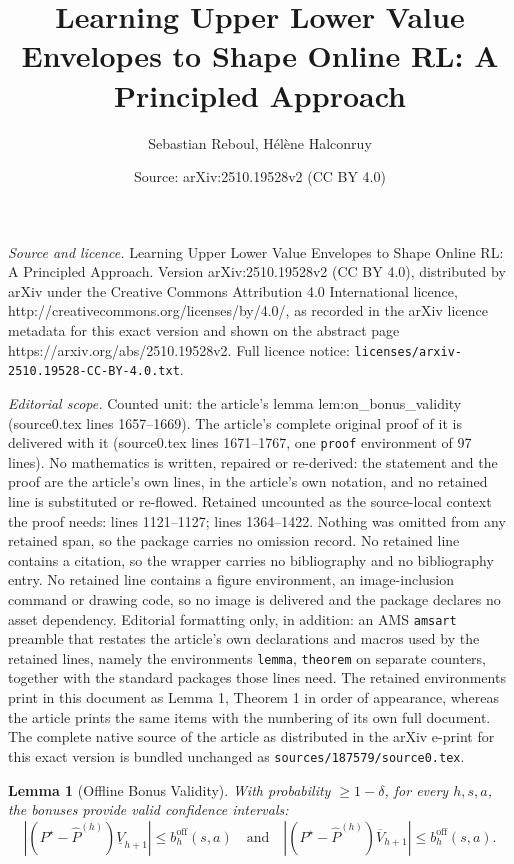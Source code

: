 \documentclass[10pt,a4paper]{amsart}
\title{Learning Upper Lower Value Envelopes to Shape Online RL: A Principled Approach}
\author{Sebastian Reboul, H\'el\`ene Halconruy}
\date{Source: arXiv:2510.19528v2 (CC BY 4.0)}
\newtheorem{lemma}{Lemma}
\newcommand{\boff}{b_h^{\off}} %
\newcommand{\off}{\mathrm{off}} %
\newcommand{\ohighv}{\overline{V}} %
\newcommand{\olowv}{\underline{V}} %
\begin{document}
\maketitle

\noindent\emph{Source and licence.} Learning Upper Lower Value Envelopes to Shape Online RL: A Principled Approach. Version arXiv:2510.19528v2 (CC BY 4.0), distributed by arXiv under the Creative Commons Attribution 4.0 International licence, http://creativecommons.org/licenses/by/4.0/, as recorded in the arXiv licence metadata for this exact version and shown on the abstract page https://arxiv.org/abs/2510.19528v2. Full licence notice: \texttt{licenses/arxiv-2510.19528-CC-BY-4.0.txt}.\par\smallskip

\noindent\textit{Editorial scope.} Counted unit: the article's lemma lem:on\_bonus\_validity (source0.tex lines 1657--1669). The article's complete original proof of it is delivered with it (source0.tex lines 1671--1767, one \texttt{proof} environment of 97 lines). No mathematics is written, repaired or re-derived: the statement and the proof are the article's own lines, in the article's own notation, and no retained line is substituted or re-flowed.  Retained uncounted as the source-local context the proof needs: lines 1121--1127; lines 1364--1422.  Nothing was omitted from any retained span, so the package carries no omission record.  No retained line contains a citation, so the wrapper carries no bibliography and no bibliography entry.  No retained line contains a figure environment, an image-inclusion command or drawing code, so no image is delivered and the package declares no asset dependency.  Editorial formatting only, in addition: an AMS \texttt{amsart} preamble that restates the article's own declarations and macros used by the retained lines, namely the environments \texttt{lemma}, \texttt{theorem} on separate counters, together with the standard packages those lines need.  The retained environments print in this document as Lemma 1, Theorem 1 in order of appearance, whereas the article prints the same items with the numbering of its own full document.  The complete native source of the article as distributed in the arXiv e-print for this exact version is bundled unchanged as \texttt{sources/187579/source0.tex}.
\begin{lemma}[Offline Bonus Validity] 
\label{lem:off_bonus_validity} 
With probability $\ge 1 - \delta$, for every $h, s, a$, the bonuses provide valid confidence intervals: 
\begin{equation}\label{eq:off_bonus_validity} 
|(P^{\star}-\widehat{P}^{(h)})\olowv_{h+1} |\le \boff(s,a) \quad\text{and}\quad |(P^{\star}-\widehat{P}^{(h)})\ohighv_{h+1}| \le \boff(s,a). 
\end{equation} 
\end{lemma}
\end{document}
